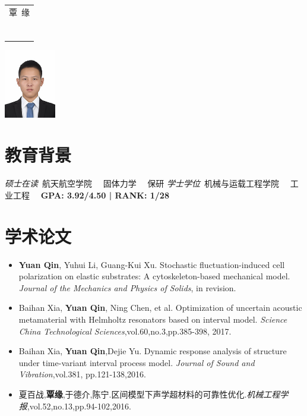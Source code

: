 \documentclass{resume}
\begin{document}

\medskip\noindent
\begin{minipage}{0.7\textwidth}
  \large{
    \begin{tabu}  { l }

      \Huge{\scshape{覃\ 缘}} \\
\ \\
       \\
    \end{tabu}
  }
\end{minipage}
\begin{minipage}{0.3\textwidth}
  \raggedleft
  \includegraphics[height=30mm]{me}
\end{minipage}

%


\section{教育背景}
\textit{硕士在读}\ 航天航空学院 \ \   固体力学 \ \ 保研
\textit{学士学位}\ 机械与运载工程学院 \ \  工业工程 \ \ \textbf{\textsc{GPA}: 3.92/4.50 | \textsc{RANK}: 1/28	}


\section{学术论文}
\begin{itemize} 
	 \item \textbf{Yuan Qin}, Yuhui Li, Guang-Kui Xu. Stochastic fluctuation-induced cell polarization on elastic substrates: A cytoskeleton-based mechanical model. \textit{Journal of the Mechanics and Physics of Solids}, in revision.
	 \item Baihan Xia, \textbf{Yuan Qin}, Ning Chen, et al. Optimization of uncertain acoustic metamaterial with Helmholtz resonators based on interval model. \textit{Science China Technological Sciences},vol.60,no.3,pp.385-398, 2017.
	 \item Baihan Xia, \textbf{Yuan Qin},Dejie Yu. Dynamic response analysis of structure under time-variant interval process model. \textit{Journal of Sound and Vibration},vol.381, pp.121-138,2016.
   \item 夏百战,\textbf{覃缘},于德介,陈宁.区间模型下声学超材料的可靠性优化.\textit{机械工程学报},vol.52,no.13,pp.94-102,2016.
  \end{itemize}
\end{document}

